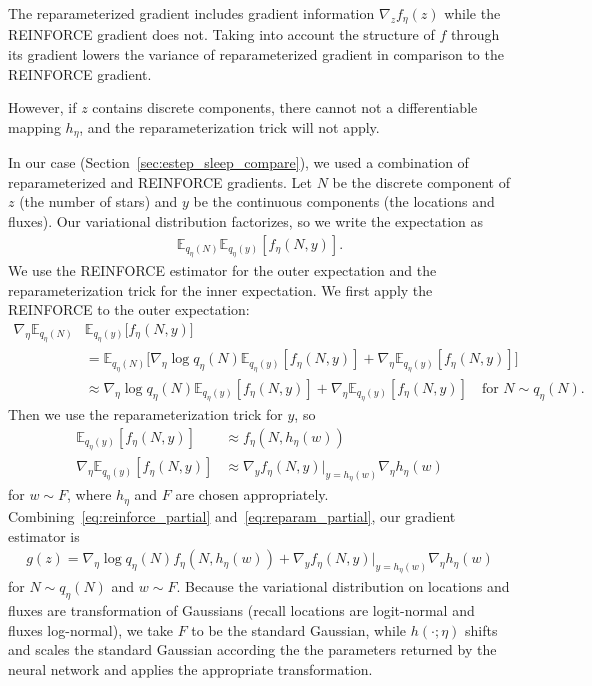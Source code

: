 \documentclass[12pt]{article}
\newcommand{\Expect}{\mathbb{E}}
\begin{document}
The reparameterized gradient includes gradient information $\nabla_z f_\eta(z)$ while the REINFORCE gradient does not. Taking into account the structure of $f$ through its gradient lowers the variance of reparameterized gradient in comparison to the REINFORCE gradient. 

However, if $z$ contains discrete components, there cannot not a differentiable mapping $h_\eta$, and the reparameterization trick will not apply. 

In our case (Section~\ref{sec:estep_sleep_compare}), we used a combination of reparameterized and REINFORCE gradients. Let $N$ be the discrete component of $z$ (the number of stars) and $y$ be the continuous components (the locations and fluxes). Our variational distribution factorizes, so we write the expectation as 
\begin{align}
 \Expect_{q_\eta(N)}\Expect_{q_\eta(y)}[f_\eta(N, y)]. 
\end{align}
We use the REINFORCE estimator for the outer expectation and the reparameterization trick for the inner expectation. We first apply the REINFORCE to the outer expectation: 
\begin{align}
    \nabla_\eta  \Expect_{q_\eta(N)}&\Expect_{q_\eta(y)}\Big[f_\eta(N, y)\Big] \\
    &=  \Expect_{q_\eta(N)}\Big[ \nabla_\eta \log q_\eta(N) \Expect_{q_\eta(y)}[f_\eta(N, y)] + 
    \nabla_\eta \Expect_{q_\eta(y)}[f_\eta(N, y)] \Big]\\
    &\approx \nabla_\eta \log q_\eta(N) \Expect_{q_\eta(y)}[f_\eta(N, y)] + 
    \nabla_\eta \Expect_{q_\eta(y)}[f_\eta(N, y)] \quad \text{for } N \sim q_\eta(N). 
    \label{eq:reinforce_partial}
\end{align}
Then we use the reparameterization trick for $y$, so 
\begin{align}
    \Expect_{q_\eta(y)}[f_\eta(N, y)] &\approx f_\eta(N, h_\eta(w))\\
    \nabla_\eta \Expect_{q_\eta(y)}[f_\eta(N, y)] &\approx  \nabla_y f_\eta(N, y)\Big|_{y = h_\eta(w)}
    \nabla_\eta h_\eta(w) 
    \label{eq:reparam_partial}
\end{align}
for $w \sim F$, where $h_\eta$ and $F$ are chosen appropriately. Combining~\eqref{eq:reinforce_partial} and~\eqref{eq:reparam_partial}, our gradient estimator is 
\begin{align}
    g(z) = \nabla_\eta \log q_\eta(N) 
    f_\eta(N, h_\eta(w)) + 
    \nabla_y f_\eta(N, y)\Big|_{y = h_\eta(w)}
    \nabla_\eta h_\eta(w) 
\end{align}
for $N\sim q_\eta(N)$ and $w\sim F$. Because the variational distribution on locations and fluxes are transformation of Gaussians (recall locations are logit-normal and fluxes log-normal), we take $F$ to be the standard Gaussian, while $h(\cdot ; \eta)$ shifts and scales the standard Gaussian according the the parameters returned by the neural network and applies the appropriate transformation. 
\end{document}
